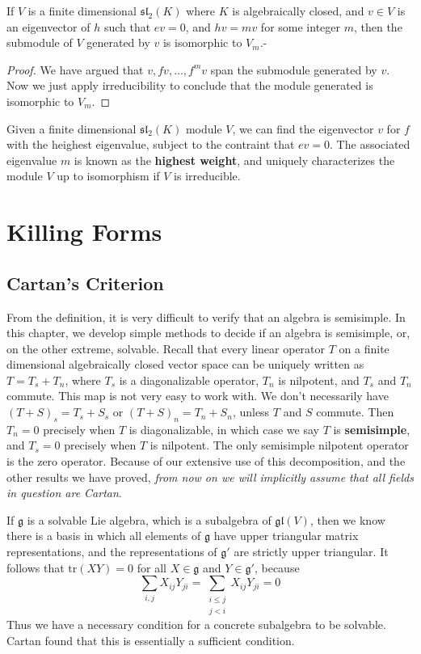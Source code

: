 \begin{corollary}
    If $V$ is a finite dimensional $\mathfrak{sl}_2(K)$ where $K$ is algebraically closed, and $v \in V$ is an eigenvector of $h$ such that $ev = 0$, and $hv = mv$ for some integer $m$, then the submodule of $V$ generated by $v$ is isomorphic to $V_m$.-
\end{corollary}
\begin{proof}
    We have argued that $v, fv, \dots, f^m v$ span the submodule generated by $v$. Now we just apply irreducibility to conclude that the module generated is isomorphic to $V_m$.
\end{proof}

Given a finite dimensional $\mathfrak{sl}_2(K)$ module $V$, we can find the eigenvector $v$ for $f$ with the heighest eigenvalue, subject to the contraint that $ev = 0$. The associated eigenvalue $m$ is known as the {\bf highest weight}, and uniquely characterizes the module $V$ up to isomorphism if $V$ is irreducible.

\chapter{Killing Forms}

\section{Cartan's Criterion}

From the definition, it is very difficult to verify that an algebra is semisimple. In this chapter, we develop simple methods to decide if an algebra is semisimple, or, on the other extreme, solvable. Recall that every linear operator $T$ on a finite dimensional algebraically closed vector space can be uniquely written as $T = T_s + T_n$, where $T_s$ is a diagonalizable operator, $T_n$ is nilpotent, and $T_s$ and $T_n$ commute. This map is not very easy to work with. We don't necessarily have $(T + S)_s = T_s + S_s$ or $(T + S)_n = T_n + S_n$, unless $T$ and $S$ commute. Then $T_n = 0$ precisely when $T$ is diagonalizable, in which case we say $T$ is {\bf semisimple}, and $T_s = 0$ precisely when $T$ is nilpotent. The only semisimple nilpotent operator is the zero operator. Because of our extensive use of this decomposition, and the other results we have proved, {\it from now on we will implicitly assume that all fields in question are Cartan}.

If $\mathfrak{g}$ is a solvable Lie algebra, which is a subalgebra of $\mathfrak{gl}(V)$, then we know there is a basis in which all elements of $\mathfrak{g}$ have upper triangular matrix representations, and the representations of $\mathfrak{g}'$ are strictly upper triangular. It follows that $\text{tr}(XY) = 0$ for all $X \in \mathfrak{g}$ and $Y \in \mathfrak{g}'$, because
%
\[ \sum_{i,j} X_{ij}Y_{ji} = \sum_{\substack{i \leq j\\j < i}} X_{ij} Y_{ji} = 0 \]
%
Thus we have a necessary condition for a concrete subalgebra to be solvable. Cartan found that this is essentially a sufficient condition.

